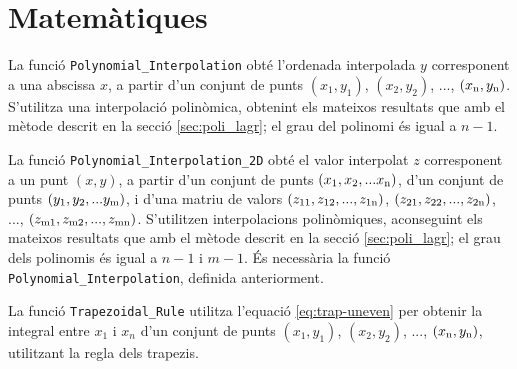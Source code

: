 


\section{Matemàtiques}

La funció \texttt{Polynomial\_Interpolation} obté l'ordenada interpolada $y$ corresponent a una abscissa $x$, a partir d'un conjunt  de punts $(x_1,y_1)$, $(x_2,y_2)$, ..., $(x_\mathrm{n},y_\mathrm{n})$. S'utilitza una interpolació polinòmica, obtenint els mateixos resultats que amb el mètode descrit en la secció \vref{sec:poli_lagr}; el grau del polinomi és igual a $n-1$.




La funció \texttt{Polynomial\_Interpolation\_2D} obté el valor interpolat $z$ corresponent a un punt $(x, y)$, a partir d'un conjunt de punts $(x_\mathrm{1}, x_\mathrm{2}, ... x_\mathrm{n})$, d'un conjunt de punts $(y_\mathrm{1}, y_\mathrm{2}, ... y_\mathrm{m})$, i d'una matriu de valors $(z_\mathrm{11}, z_\mathrm{12}, ..., z_\mathrm{1n})$,
$(z_\mathrm{21}, z_\mathrm{22}, ..., z_\mathrm{2n})$, ..., $(z_\mathrm{m1}, z_\mathrm{m2}, ..., z_\mathrm{mn})$. S'utilitzen  interpolacions polinòmiques, aconseguint els mateixos resultats que amb el mètode descrit en la secció \vref{sec:poli_lagr}; el grau dels polinomis és igual a $n-1$ i $m-1$.
És necessària la funció \texttt{Polynomial\_Interpolation}, definida anteriorment.




La funció \texttt{Trapezoidal\_Rule} utilitza l'equació  \eqref{eq:trap-uneven} per obtenir la integral entre $x_1$ i $x_n$ d'un conjunt  de punts $(x_1,y_1)$, $(x_2,y_2)$, ..., $(x_\mathrm{n},y_\mathrm{n})$, utilitzant la regla dels trapezis.


